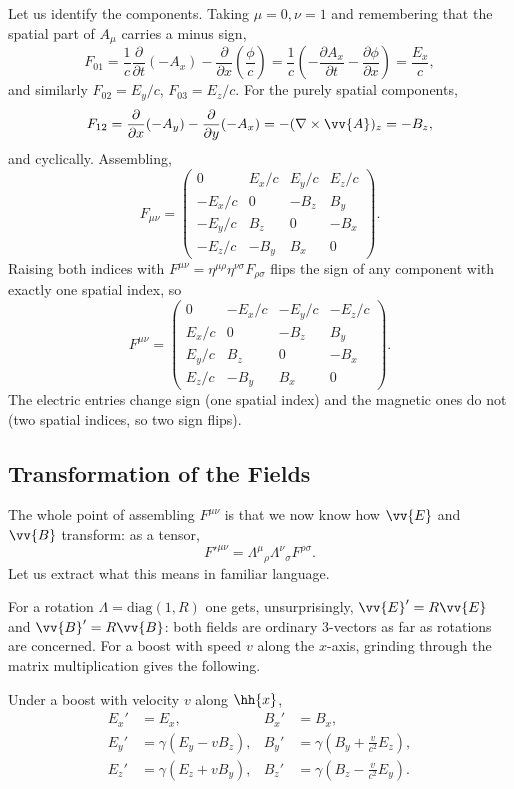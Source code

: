 Let us identify the components. Taking $\mu = 0, \nu = 1$ and remembering that the spatial part of $A_\mu$ carries a minus sign,
$$
F_{01} = \frac{1}{c}\frac{\partial}{\partial t}(-A_x) - \frac{\partial}{\partial x}\left(\frac{\phi}{c}\right) = \frac{1}{c}\left(-\frac{\partial A_x}{\partial t} - \frac{\partial \phi}{\partial x}\right) = \frac{E_x}{c},
$$
and similarly $F_{02} = E_y/c$, $F_{03} = E_z/c$. For the purely spatial components,
$$
F_{12} = \frac{\partial}{\partial x}(-A_y) - \frac{\partial}{\partial y}(-A_x) = -(\nabla\times\vv{A})_z = -B_z,
$$
and cyclically. Assembling,
$$
F_{\mu\nu} = \begin{pmatrix} 0 & E_x/c & E_y/c & E_z/c\\ -E_x/c & 0 & -B_z & B_y\\ -E_y/c & B_z & 0 & -B_x\\ -E_z/c & -B_y & B_x & 0\end{pmatrix}.
$$
Raising both indices with $F^{\mu\nu} = \eta^{\mu\rho}\eta^{\nu\sigma}F_{\rho\sigma}$ flips the sign of any component with exactly one spatial index, so
$$
F^{\mu\nu} = \begin{pmatrix} 0 & -E_x/c & -E_y/c & -E_z/c\\ E_x/c & 0 & -B_z & B_y\\ E_y/c & B_z & 0 & -B_x\\ E_z/c & -B_y & B_x & 0\end{pmatrix}.
$$
The electric entries change sign (one spatial index) and the magnetic ones do not (two spatial indices, so two sign flips).

\subsection{Transformation of the Fields}

The whole point of assembling $F^{\mu\nu}$ is that we now know how $\vv{E}$ and $\vv{B}$ transform: as a tensor,
$$
F'^{\mu\nu} = \Lambda^\mu{}_\rho \Lambda^\nu{}_\sigma F^{\rho\sigma}.
$$
Let us extract what this means in familiar language.

For a rotation $\Lambda = \mathrm{diag}(1,R)$ one gets, unsurprisingly, $\vv{E}' = R\vv{E}$ and $\vv{B}' = R\vv{B}$: both fields are ordinary 3-vectors as far as rotations are concerned. For a boost with speed $v$ along the $x$-axis, grinding through the matrix multiplication gives the following.

\begin{proposition}
	Under a boost with velocity $v$ along $\hh{x}$,
	\begin{align*}
		E_x' &= E_x, & B_x' &= B_x,\\
		E_y' &= \gamma(E_y - vB_z), & B_y' &= \gamma\left(B_y + \frac{v}{c^2}E_z\right),\\
		E_z' &= \gamma(E_z + vB_y), & B_z' &= \gamma\left(B_z - \frac{v}{c^2}E_y\right).
	\end{align*}
\end{proposition}

